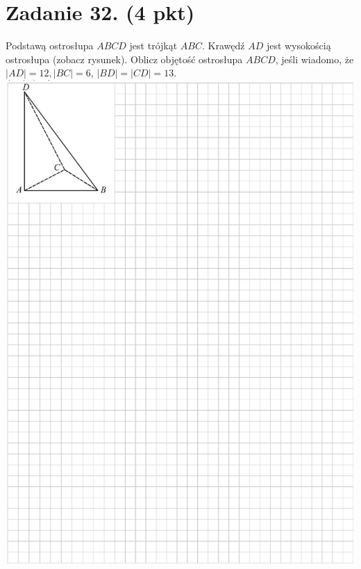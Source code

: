 \documentclass[10pt]{article}
\begin{document}
\section*{Zadanie 32. (4 pkt)}
Podstawą ostrosłupa \(A B C D\) jest trójkąt \(A B C\). Krawędź \(A D\) jest wysokością ostrosłupa (zobacz rysunek). Oblicz objętość ostrosłupa \(A B C D\), jeśli wiadomo, że \(|A D|=12,|B C|=6\), \(|B D|=|C D|=13\).\\
\includegraphics[max width=\textwidth, center]{2024_11_21_caf6b2e64dd65c9b24eeg-14}\\
\end{document}
